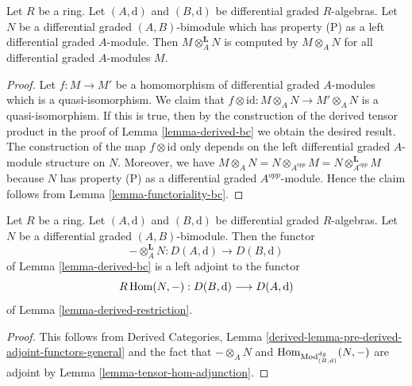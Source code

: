 \begin{lemma}
\label{lemma-compute-bc}
Let $R$ be a ring. Let $(A, \text{d})$ and $(B, \text{d})$ be
differential graded $R$-algebras. Let $N$ be a differential graded
$(A, B)$-bimodule which has property (P) as a left differential graded
$A$-module. Then $M \otimes_A^\mathbf{L} N$ is computed by
$M \otimes_A N$ for all differential graded $A$-modules $M$.
\end{lemma}

\begin{proof}
Let $f : M \to M'$ be a homomorphism of differential graded $A$-modules
which is a quasi-isomorphism. We claim that $f \otimes \text{id} :
M \otimes_A N \to M' \otimes_A N$ is a quasi-isomorphism. If this
is true, then by the construction of the derived tensor product
in the proof of Lemma \ref{lemma-derived-bc} we obtain the desired result.
The construction of the map $f \otimes \text{id}$ only depends
on the left differential graded $A$-module structure on $N$.
Moreover, we have $M \otimes_A N = N \otimes_{A^{opp}} M =
N \otimes_{A^{opp}}^\mathbf{L} M$ because $N$ has property (P) as
a differential graded $A^{opp}$-module. Hence the claim follows
from Lemma \ref{lemma-functoriality-bc}.
\end{proof}

\begin{lemma}
\label{lemma-tensor-hom-adjoint}
Let $R$ be a ring.
Let $(A, \text{d})$ and $(B, \text{d})$ be differential graded $R$-algebras.
Let $N$ be a differential graded $(A, B)$-bimodule.
Then the functor
$$
- \otimes_A^\mathbf{L} N : D(A, \text{d}) \longrightarrow D(B, \text{d})
$$
of Lemma \ref{lemma-derived-bc} is a left adjoint to the functor
$$
R\mathop{\mathrm{Hom}}\nolimits(N, -) : D(B, \text{d}) \longrightarrow D(A, \text{d})
$$
of Lemma \ref{lemma-derived-restriction}.
\end{lemma}

\begin{proof}
This follows from Derived Categories, Lemma
\ref{derived-lemma-pre-derived-adjoint-functors-general}
and the fact that $- \otimes_A N$ and
$\mathop{\mathrm{Hom}}\nolimits_{\text{Mod}^{dg}_{(B, \text{d})}}(N, -)$ are adjoint by
Lemma \ref{lemma-tensor-hom-adjunction}.
\end{proof}

